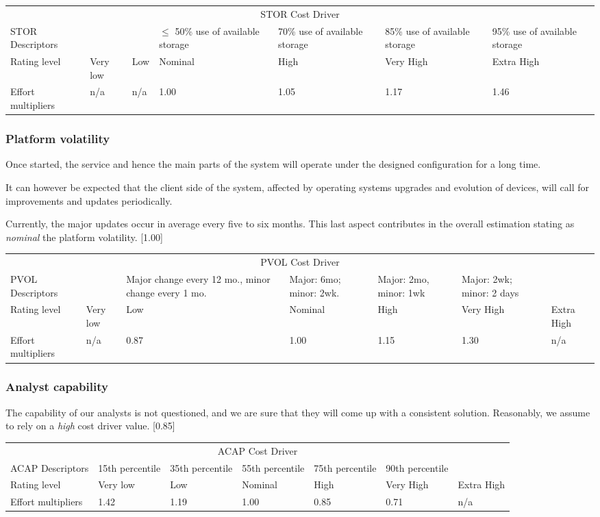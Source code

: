 \documentclass{scrreprt}
\newcommand{\costdescriptors}[7]{
	#1 & #2 & #3 & #4 & #5 & #6 & #7\\
}
\newcommand{\ratinglevel}[6]{
	Rating level & #1 & #2 & #3 & #4 & #5 & #6 \\\hline
}
\newcommand{\effortmultipliers}[6]{
	Effort multipliers & #1 & #2 & #3 & #4 & #5 & #6 \\\hline
}
\newenvironment{costdriverstable}[1]{
	\setlength{\LTleft}{-40pt}
	\begin{longtable}{|p{\dimexpr.16\textwidth}|p{\dimexpr.14\textwidth}|p{\dimexpr.14\textwidth}|p{\dimexpr.14\textwidth}|p{\dimexpr.14\textwidth}|p{\dimexpr.14\textwidth}|p{\dimexpr.14\textwidth}|}
	\hline
	\multicolumn{7}{|c|}{{#1}}\\\hhline{|=======|}
}{
	\hline\end{longtable}
}
\begin{document}
	\begin{costdriverstable}{STOR Cost Driver}
		\costdescriptors{STOR Descriptors}{}{}{$\le$  50\% use of available storage}{70\% use of available storage}{85\% use of available storage} {95\% use of available storage}\hline
		\ratinglevel{Very low}{Low}{Nominal}{High}{Very High}{Extra High}
		\effortmultipliers{n/a}{n/a}{1.00}{\cellcolor[gray]{0.75}1.05}{1.17}{1.46}	
	\end{costdriverstable}
	
\subsubsection{Platform volatility}
Once started, the service and hence the main parts of the system will operate under the designed configuration for a long time.

It can however be expected that the client side of the system, affected by operating systems upgrades and evolution of devices, will call for improvements and updates periodically.

Currently, the major updates occur in average every five to six months.
This last aspect contributes in the overall estimation stating as \emph{nominal} the platform volatility. [1.00]
	
		\begin{costdriverstable}{PVOL Cost Driver}
		\costdescriptors{PVOL Descriptors}{}{Major change every 12 mo., minor change every 1 mo.}{Major: 6mo; minor: 2wk.}{Major: 2mo, minor: 1wk}	{Major: 2wk; minor: 2 days}{}\hline
		\ratinglevel{Very low}{Low}{Nominal}{High}{Very High}{Extra High}
		\effortmultipliers{n/a}{0.87}{\cellcolor[gray]{0.75}1.00}{1.15}{1.30}{n/a}
	\end{costdriverstable}
	
\subsubsection{Analyst capability}
The capability of our analysts is not questioned, and we are sure that they will come up with a consistent solution. Reasonably, we assume to rely on a \emph{high} cost driver value. [0.85]
	
		\begin{costdriverstable}{ACAP Cost Driver}
		\costdescriptors{ACAP Descriptors}{15th percentile}{35th percentile}{55th percentile}{75th percentile}{90th percentile}{}\hline
		\ratinglevel{Very low}{Low}{Nominal}{High}{Very High}{Extra High}
		\effortmultipliers{1.42}{1.19}{1.00}{\cellcolor[gray]{0.75}0.85}{0.71}{n/a}	
	\end{costdriverstable}
	
\end{document}
